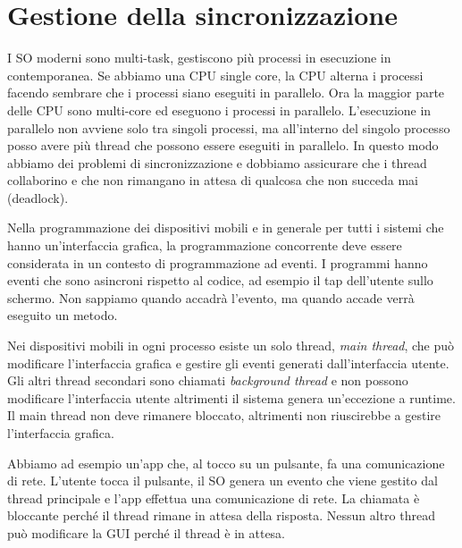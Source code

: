 \section{Gestione della sincronizzazione}
I SO moderni sono multi-task, gestiscono più processi in esecuzione in contemporanea. 
Se abbiamo una CPU single core, la CPU alterna i processi facendo sembrare che i processi siano eseguiti in parallelo. Ora la maggior parte delle CPU sono multi-core ed eseguono i processi in parallelo.
L'esecuzione in parallelo non avviene solo tra singoli processi, ma all'interno del singolo processo posso avere più thread che possono essere eseguiti in parallelo. 
In questo modo abbiamo dei problemi di sincronizzazione e dobbiamo assicurare che i thread collaborino e che non rimangano in attesa di qualcosa che non succeda mai (deadlock).

Nella programmazione dei dispositivi mobili e in generale per tutti i sistemi che hanno un'interfaccia grafica, la programmazione concorrente deve essere considerata in un contesto di programmazione ad eventi.
I programmi hanno eventi che sono asincroni rispetto al codice, ad esempio il tap dell'utente sullo schermo.
Non sappiamo quando accadrà l'evento, ma quando accade verrà eseguito un metodo. 

Nei dispositivi mobili in ogni processo esiste un solo thread, \textit{main thread}, che può modificare l'interfaccia grafica e gestire gli eventi generati dall'interfaccia utente. 
Gli altri thread secondari sono chiamati \textit{background thread} e non possono modificare l’interfaccia utente altrimenti il sistema genera un’eccezione a runtime.
Il main thread non deve rimanere bloccato, altrimenti non riuscirebbe a gestire l'interfaccia grafica. 

Abbiamo ad esempio un'app che, al tocco su un pulsante, fa una comunicazione di rete. 
L'utente tocca il pulsante, il SO genera un evento che viene gestito dal thread principale e l'app effettua una comunicazione di rete. La chiamata è bloccante perché il thread rimane in attesa della risposta. Nessun altro thread può modificare la GUI perché il thread è in attesa.

